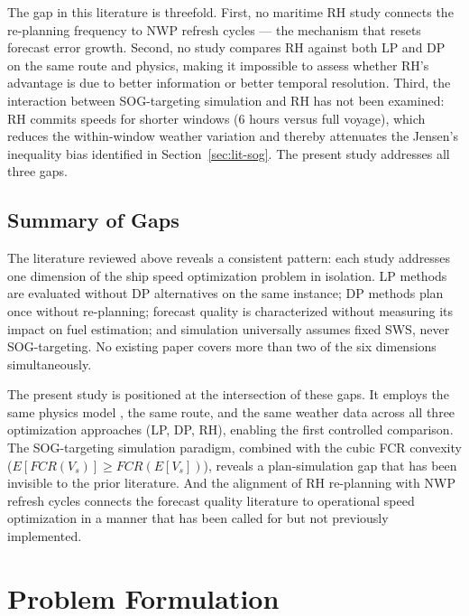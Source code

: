 \documentclass[review,authoryear]{elsarticle}  %
\begin{document}
The gap in this literature is threefold. First, no maritime RH study connects the re-planning frequency to NWP refresh cycles --- the mechanism that resets forecast error growth. Second, no study compares RH against both LP and DP on the same route and physics, making it impossible to assess whether RH's advantage is due to better information or better temporal resolution. Third, the interaction between SOG-targeting simulation and RH has not been examined: RH commits speeds for shorter windows (6 hours versus full voyage), which reduces the within-window weather variation and thereby attenuates the Jensen's inequality bias identified in Section~\ref{sec:lit-sog}. The present study addresses all three gaps.

\subsection{Summary of Gaps}
\label{sec:lit-gaps}


The literature reviewed above reveals a consistent pattern: each study addresses one dimension of the ship speed optimization problem in isolation. LP methods are evaluated without DP alternatives on the same instance; DP methods plan once without re-planning; forecast quality is characterized without measuring its impact on fuel estimation; and simulation universally assumes fixed SWS, never SOG-targeting. No existing paper covers more than two of the six dimensions simultaneously.

The present study is positioned at the intersection of these gaps. It employs the same physics model \citet{Yang2020}, the same route, and the same weather data across all three optimization approaches (LP, DP, RH), enabling the first controlled comparison. The SOG-targeting simulation paradigm, combined with the cubic FCR convexity ($E[FCR(V_s)] \geq FCR(E[V_s])$), reveals a plan-simulation gap that has been invisible to the prior literature. And the alignment of RH re-planning with NWP refresh cycles connects the forecast quality literature to operational speed optimization in a manner that has been called for \citet{Yang2020,Luo2023} but not previously implemented.


\section{Problem Formulation}
\label{sec:problem}
\end{document}
